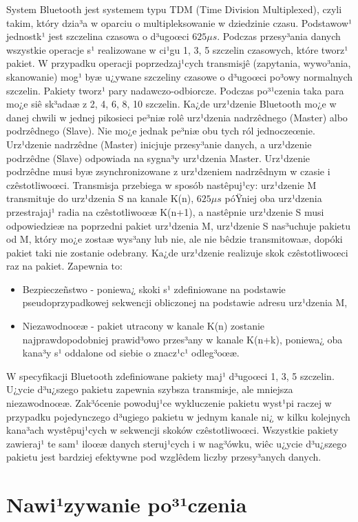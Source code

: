 System Bluetooth jest systemem typu TDM (Time Division Multiplexed),
czyli takim, który dzia³a w oparciu o multipleksowanie w dziedzinie
czasu. Podstawow¹ jednostk¹ jest szczelina czasowa o d³ugoœci $625
\mu s$. Podczas przesy³ania danych wszystkie operacje s¹ realizowane
w ci¹gu 1, 3, 5 szczelin czasowych, które tworz¹ pakiet. W przypadku
operacji poprzedzaj¹cych transmisjê (zapytania, wywo³ania,
skanowanie) mog¹ byæ u¿ywane szczeliny czasowe o d³ugoœci po³owy
normalnych szczelin. Pakiety tworz¹ pary nadawczo-odbiorcze. Podczas
po³¹czenia taka para mo¿e siê sk³adaæ z 2, 4, 6, 8, 10 szczelin.
Ka¿de urz¹dzenie Bluetooth mo¿e w danej chwili w jednej pikosieci
pe³niæ rolê urz¹dzenia nadrzêdnego (Master) albo podrzêdnego
(Slave). Nie mo¿e jednak pe³niæ obu tych ról jednoczeœnie.
Urz¹dzenie nadrzêdne (Master) inicjuje przesy³anie danych, a
urz¹dzenie podrzêdne (Slave) odpowiada na sygna³y urz¹dzenia Master.
Urz¹dzenie podrzêdne musi byæ zsynchronizowane z urz¹dzeniem
nadrzêdnym w czasie i czêstotliwoœci. Transmisja przebiega w sposób
nastêpuj¹cy: urz¹dzenie M transmituje do urz¹dzenia S na kanale
K(n), $625 \mu s$ póŸniej oba urz¹dzenia przestrajaj¹ radia na
czêstotliwoœæ K(n+1), a nastêpnie urz¹dzenie S musi odpowiedzieæ na
poprzedni pakiet urz¹dzenia M, urz¹dzenie S nas³uchuje pakietu od M,
który mo¿e zostaæ wys³any lub nie, ale nie bêdzie transmitowaæ,
dopóki pakiet taki nie zostanie odebrany. Ka¿de urz¹dzenie realizuje
skok czêstotliwoœci raz na pakiet. Zapewnia to:
\begin{itemize}
\item Bezpieczeñstwo - poniewa¿ skoki s¹ zdefiniowane na podstawie pseudoprzypadkowej sekwencji obliczonej na podstawie adresu urz¹dzenia M,
\item Niezawodnoœæ - pakiet utracony w kanale K(n) zostanie najprawdopodobniej prawid³owo przes³any w kanale
K(n+k), poniewa¿ oba kana³y s¹ oddalone od siebie o znacz¹c¹
odleg³oœæ.
\end{itemize}
W specyfikacji Bluetooth zdefiniowane pakiety maj¹ d³ugoœci 1, 3, 5
szczelin. U¿ycie d³u¿szego pakietu zapewnia szybsza transmisje, ale
mniejsza niezawodnoœæ. Zak³ócenie powoduj¹ce wykluczenie pakietu
wyst¹pi raczej w przypadku pojedynczego d³ugiego pakietu w jednym
kanale ni¿ w kilku kolejnych kana³ach wystêpuj¹cych w sekwencji
skoków czêstotliwoœci. Wszystkie pakiety zawieraj¹ te sam¹ iloœæ
danych steruj¹cych i w nag³ówku, wiêc u¿ycie d³u¿szego pakietu jest
bardziej efektywne pod wzglêdem liczby przesy³anych danych.

\section{Nawi¹zywanie po³¹czenia}
\label{sec:Nawiazywanie polaczenia}

